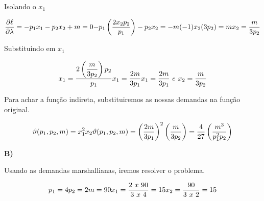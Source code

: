 \begin{flushleft}
\begin{center}
Isolando o $x_{1}$
\end{center}

\begin{equation}
\frac{\partial\ell}{\partial \lambda} = -p_{1}x_{1} - p_{2}x_{2} + m = 0
$$\\$$
-p_{1}\left(\dfrac{2x_{2}p_{2}}{p_{1}}\right) - p_{2}x_{2} = -m (-1)
$$\\$$
x_{2}(3p_{2}) = m
$$\\$$
x_{2} = \dfrac{m}{3p_{2}}
\end{equation}

\begin{center}
Substituindo em $x_{1}$
\end{center}

\begin{equation}
x_{1} = \dfrac {2 \left( \dfrac{m}{3p_{2}}\right)p_{2}} {p_{1}}
$$\\$$
x_{1} = \dfrac{2m}{3p_{1}}
$$\\$$
x_{1} = \dfrac{2m}{3p_{1}} \  e \ x_{2} = \dfrac{m}{3p_{2}}
\end{equation}
\begin{center}
Para achar a função indireta, substituiremos as nossas demandas na função original.
\end{center}

\begin{equation}
\vartheta(p_{1},p_{2},m) = x_{1}^{2}x_{2}
$$\\$$
\vartheta(p_{1},p_{2},m) = \left( \dfrac{2m}{3p_{1}} \right)^{2} \left( \dfrac{m}{3p_{2}} \right) =  \dfrac{4}{27} \left(\dfrac{m^{3}}{p_{1}^{2}p_{2}}        \right)
\end{equation}

\singlespacing

\textbf{B)}

\begin{center}
Usando as demandas marshallianas, iremos resolver o problema.
\end{center}

\begin{equation}
p_{1} = 4
$$\\$$
p_{2} = 2
$$\\$$
m = 90
$$\\$$
x_{1} = \dfrac{2 \ x \ 90}{3 \ x \ 4} = 15
$$\\$$
x_{2} = \dfrac{90}{3 \ x \ 2} = 15
\end{equation}

\singlespacing


\end{flushleft}
